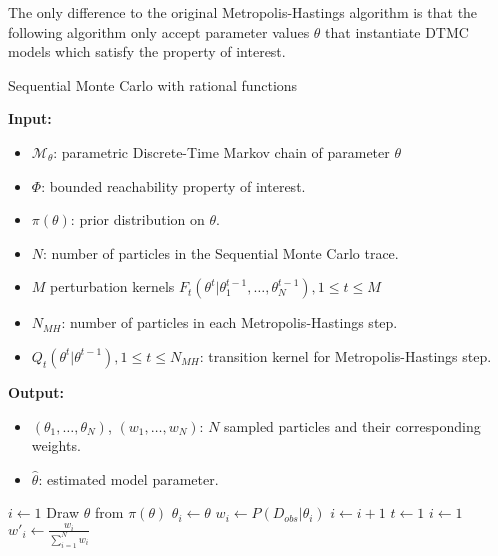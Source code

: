 The only difference to the original Metropolis-Hastings algorithm is that the following algorithm
only accept parameter values $\theta$ that instantiate DTMC models which satisfy the property of
interest.
\begin{algorithm}[H]
    \caption{Sequential Monte Carlo with rational functions}
    \label{alg:rf-smc}
    \footnotesize{
        \hspace*{\algorithmicindent} \textbf{Input:}
        \begin{itemize}[noitemsep,topsep=0pt]
            \item $\mathcal{M}_\theta$: parametric Discrete-Time Markov chain of parameter $\theta$
            \item $\Phi$: bounded reachability property of interest.
            \item $\pi(\theta)$: prior distribution on $\theta$.
            \item $N$: number of particles in the Sequential Monte Carlo trace.
            \item $M$ perturbation kernels $F_t(\theta^t | \theta^{t-1}_1,\ldots,\theta^{t-1}_N), 1\leq t \leq M$
            \item $N_{MH}$: number of particles in each Metropolis-Hastings step.
            \item $Q_t(\theta^t|\theta^{t-1}), 1 \leq t \leq N_{MH}$: transition kernel for Metropolis-Hastings step.
        \end{itemize}
        \hspace*{\algorithmicindent} \textbf{Output:}
        \begin{itemize}[noitemsep,topsep=0pt]
            \item $(\theta_1,\ldots,\theta_N)$, $(w_1,\ldots,w_N)$: $N$ sampled particles and their corresponding weights.
            \item $\hat{\theta}$: estimated model parameter.
        \end{itemize}
    }
    \begin{algorithmic}[1]
        \State $i \leftarrow 1$
         
        \State Draw $\theta$ from $\pi(\theta)$
        \State $\theta_i \leftarrow \theta$
        \State $w_i \leftarrow P(D_{obs}|\theta_i)$
        \State $i \leftarrow i + 1$
        \EndWhile
        \State $t \leftarrow 1$
        \State $i \leftarrow 1$ 
        \State $w'_i \leftarrow \frac{w_i}{\sum_{i=1}^N w_i} $

\end{algorithmic}
\end{algorithm}
